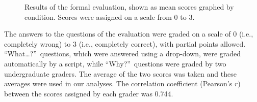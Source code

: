 \begin{figure}
\centering


	\caption[Results of the formal evaluation, shown as mean scores graphed by condition]{Results of the formal evaluation, shown as mean scores graphed by condition.  Scores were assigned on a scale from 0 to 3.}
	\label{fig:results}
\end{figure}

The answers to the questions of the evaluation were graded on a scale of 0 (i.e., completely wrong) to 3 (i.e., completely correct), with partial points allowed.  ``What\ldots?''\ questions, which were answered using a drop-down, were graded automatically by a script, while ``Why?''\ questions were graded by two undergraduate graders.  The average of the two scores was taken and these averages were used in our analyses.  The correlation coefficient (Pearson's $r$) between the scores assigned by each grader was 0.744.

